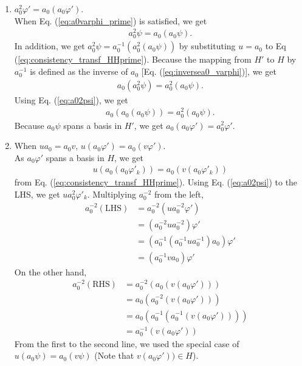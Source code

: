 \documentclass{article}
\theoremstyle{definition}
\begin{document}
\begin{enumerate}  
  \item $a_0^2 \varphi' = a_0 (a_0 \varphi')$.\\
  When Eq. (\ref{eq:a0varphi_prime}) is satisfied, we get 
  \begin{align}
    a_0^2 \psi = a_0 (a_0 \psi).
    \label{eq:a02psi}
  \end{align} 
  In addition, we get $a_0^2 \psi = a_0^{-1} (a_0^2 (a_0 \psi))$ by substituting $u=a_0$ to Eq (\ref{eq:consistency_transf_HHprime}). Because the mapping from $H'$ to $H$ by $a_0^{-1}$ is defined as the inverse of $a_0$ [Eq. (\ref{eq:inversea0_varphi})], we get 
  \begin{align}
    a_0(a_0^2 \psi) =  a_0^2 (a_0 \psi).
  \end{align}
  Using Eq. (\ref{eq:a02psi}), we get 
  \begin{align}
    a_0(a_0(a_0 \psi)) =  a_0^2 (a_0 \psi).
  \end{align}
  Because $a_0 \psi$ spans a basis in $H'$, we get $a_0(a_0 \varphi') =  a_0^2 \varphi'$.
  \item When $u a_0 = a_0 v$, $u (a_0 \varphi') = a_0 (v \varphi')$.\\
  As $a_0 \varphi'$ spans a basis in $H$, we get
  \begin{align}
    u (a_0 (a_0 \varphi'_k)) = a_0 (v(a_0 \varphi'_k))
  \end{align}
  from Eq. (\ref{eq:consistency_transf_HHprime}). Using Eq. (\ref{eq:a02psi}) to the LHS, we get $u a_0^2 \varphi'_k$. Multiplying $a_0^{-2}$ from the left, 
  \begin{align}
    a_0^{-2} (\text{LHS}) &= a_0^{-2} (u a_0^{-2} \varphi')
    \nonumber
    \\&=
    (a_0^{-2} u a_0^{-2}) \varphi'
    \nonumber
    \\&=
    (a_0^{-1} (a_0^{-1} u a_0^{-1}) a_0)\varphi'
    \nonumber
    \\&=
    (a_0^{-1} v a_0)\varphi'
  \end{align}
  On the other hand,
  \begin{align}
    a_0^{-2} (\text{RHS}) 
    &=
    a_0^{-2} (a_0 (v(a_0 \varphi')))
    \nonumber
    \\&=
    a_0 (a_0^{-2} (v(a_0 \varphi')))
    \nonumber
    \\&=
    a_0 (a_0^{-1} (a_0^{-1} (v(a_0 \varphi'))))
    \\&=
    a_0^{-1} (v(a_0 \varphi'))
  \end{align}
  From the first to the second line, we used the special case of $u (a_0 \psi) = a_0 (v \psi)$ (Note that $v(a_0 \varphi')) \in H$).

\end{enumerate}
\end{document}
